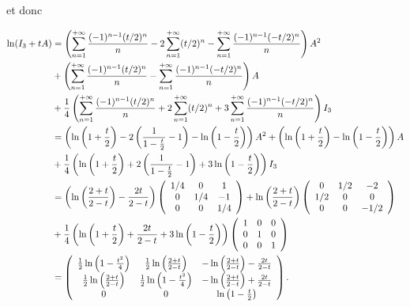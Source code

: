 {{et donc

\begin{align*}\ensuremath
\ln(I_3+tA)&=\left(\sum_{n=1}^{+\infty} \frac{(-1)^{n-1}(t/2)^n}{n}-2\sum_{n=1}^{+\infty}(t/2)^n-\sum_{n=1}^{+\infty} \frac{(-1)^{n-1}(-t/2)^n}{n}\right)A^2\\
 &+\left(\sum_{n=1}^{+\infty} \frac{(-1)^{n-1}(t/2)^n}{n}-\sum_{n=1}^{+\infty} \frac{(-1)^{n-1}(-t/2)^n}{n}\right)A\\
  &+ \frac{1}{4}\left(\sum_{n=1}^{+\infty} \frac{(-1)^{n-1}(t/2)^n}{n}+2\sum_{n=1}^{+\infty}(t/2)^n+3\sum_{n=1}^{+\infty} \frac{(-1)^{n-1}(-t/2)^n}{n}\right)I_3\\
  &=\left(\ln\left(1+ \frac{t}{2}\right)-2\left( \frac{1}{1- \frac{t}{2}}-1\right)-\ln\left(1- \frac{t}{2}\right)\right)A^2+\left(\ln\left(1+ \frac{t}{2}\right)-\ln\left(1- \frac{t}{2}\right)\right)A\\
  &+ \frac{1}{4}\left(\ln\left(1+ \frac{t}{2}\right)+2\left( \frac{1}{1- \frac{t}{2}}-1\right)+3\ln\left(1- \frac{t}{2}\right)\right)I_3\\
  &=\left(\ln\left( \frac{2+t}{2-t}\right)- \frac{2t}{2-t}\right)\left(
\begin{array}{ccc}
1/4&0&1\\
0&1/4&-1\\
0&0&1/4
\end{array}
\right)+\ln\left( \frac{2+t}{2-t}\right)\left(
\begin{array}{ccc}
0&1/2&-2\\
1/2&0&0\\
0&0&-1/2
\end{array}
\right)\\
  &+ \frac{1}{4}\left(\ln\left(1+ \frac{t}{2}\right)+ \frac{2t}{2-t}+3\ln\left(1- \frac{t}{2}\right)\right)\left(
\begin{array}{ccc}
1&0&0\\
0&1&0\\
0&0&1
\end{array}
\right)\\
 &=\left(
 \begin{array}{ccc}
 \frac{1}{2}\ln\left(1- \frac{t^2}{4}\right)& \frac{1}{2}\ln\left( \frac{2+t}{2-t}\right)&-\ln\left( \frac{2+t}{2-t}\right)- \frac{2t}{2-t}\\
 \frac{1}{2}\ln\left( \frac{2+t}{2-t}\right)& \frac{1}{2}\ln\left(1- \frac{t^2}{4}\right)&-\ln\left( \frac{2+t}{2-t}\right)+ \frac{2t}{2-t}\\
 0&0&\ln\left(1- \frac{t}{2}\right)
 \end{array}
 \right).
\end{align*}

\begin{center}
\fbox{
$\forall t\in]-2,2[$, $\ln(I_3+tA)=\left(
 \begin{array}{ccc}
 \frac{1}{2}\ln\left(1- \frac{t^2}{4}\right)& \frac{1}{2}\ln\left( \frac{2+t}{2-t}\right)&-\ln\left( \frac{2+t}{2-t}\right)- \frac{2t}{2-t}\\
 \frac{1}{2}\ln\left( \frac{2+t}{2-t}\right)& \frac{1}{2}\ln\left(1- \frac{t^2}{4}\right)&-\ln\left( \frac{2+t}{2-t}\right)+ \frac{2t}{2-t}\\
 0&0&\ln\left(1- \frac{t}{2}\right)
 \end{array}
 \right)$.
}
\end{center}
}
}

